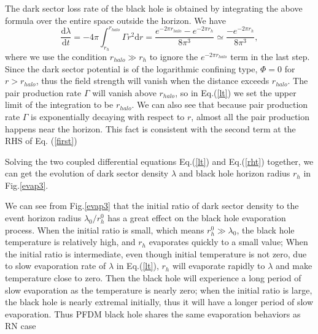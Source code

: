 \documentclass[a4paper,11pt]{article}
\begin{document}
The dark sector loss rate of the black hole is obtained by integrating the above formula over the entire space outside
the horizon. We have 
\begin{equation}
    \frac{\mathrm{d}\mathcal{\lambda}}{\mathrm{d}t}=-4\pi \int_{r_{h}}^{r_{halo}}\Gamma r^2 \mathrm{d}r=\frac{e^{-2 \pi  r_{halo}}-e^{-2 \pi  r_{h}}}{8 \pi ^3}\simeq \frac{-e^{-2 \pi  r_{h}}}{8 \pi ^3},\label{lt} 
\end{equation}
where we use the condition $r_{halo}\gg r_{h}$ to ignore the $e^{-2 \pi  r_{halo}}$ term in the last step. Since the dark sector potential is of the logarithmic confining type, $\Phi=0$ for $r>r_{halo}$, thus the field strength will vanish when the distance exceeds $r_{halo}$. The pair production rate $\Gamma$ will vanish above $r_{halo}$, so in Eq.(\ref{lt}) we set the upper limit of the integration to be $r_{halo}$. We can also see that because pair production rate $\Gamma$ is exponentially decaying with respect to $r$, almost all the pair production happens near the horizon. This fact is consistent with the second term at the RHS of Eq. (\ref{first})

Solving the two coupled differential equations Eq.(\ref{lt}) and Eq.(\ref{rht}) together, we can get the evolution of dark sector density $\lambda$ and black hole horizon radius $r_{h}$ in Fig.\ref{evap3}. 

We can see from Fig.\ref{evap3} that the initial ratio of dark sector density to the event horizon radius $\lambda_{0}/r^{0}_{h}$ has a great effect on the black hole evaporation process. When the initial ratio is small, which means $r^{0}_{h}\gg \lambda_{0}$, the black hole temperature is relatively high, and $r_{h}$ evaporates quickly to a small value; When the initial ratio is intermediate, even though initial temperature is not zero, due to slow evaporation rate of $\lambda$ in Eq.(\ref{lt}), $r_h$ will evaporate rapidly to $\lambda$ and make temperature close to zero. Then the black hole will experience a long period of slow evaporation as the temperature is nearly zero; when the initial ratio is large, the black hole is nearly extremal initially, thus it will have a longer period of slow evaporation. Thus PFDM black hole  shares the same evaporation behaviors as RN case \cite{Hiscock:1990ex,Xu:2019wak}
\end{document}
